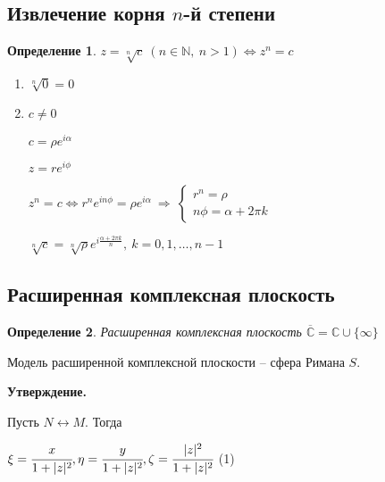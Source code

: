 \documentclass[draft]{article}
\newcommand{\then}{\ \Rightarrow\ }
\renewcommand{\C}{\mathbb{C}}
\newcommand{\N}{\mathbb{N}}
\newcommand{\LRA}{\Leftrightarrow}
\renewcommand{\bar}{\overline}
\newcommand{\opr}[1]{\begin{opred}#1\end{opred}}
\newtheorem*{opred}{Определение}
\theoremstyle{remark}
\begin{document}
\subsection{Извлечение корня $n$-й степени}

\opr{$z=\sqrt[n]{c}\ (n\in\N,\ n>1)\LRA z^n=c$}
\begin{enumerate}
\item$\sqrt[n]{0}=0$
\item$c\neq0$

$c=\rho e^{i\alpha}$

$z=re^{i\phi}$

$z^n=c\LRA r^ne^{in\phi}=\rho e^{i\alpha}\then\left\{\begin{matrix}
r^n=\rho \\
n\phi=\alpha+2\pi k
\end{matrix}\right.$

$\sqrt[n]{c}=\sqrt[n]{\rho}e^{i\frac{\alpha+2\pi k}{n}},\ k=0,1,\ldots,n-1$
\end{enumerate}


\subsection{Расширенная комплексная плоскость}

\begin{opred}
Расширенная комплексная плоскость $\bar{\C}=\C\cup\{\infty\}$
\end{opred}
Модель расширенной комплексной плоскости -- сфера Римана $S$.

{\bfseries Утверждение.}

Пусть $N\leftrightarrow M$. Тогда

$\xi=\cfrac{x}{1+|z|^2}, \eta=\cfrac{y}{1+|z|^2}, \zeta=\cfrac{|z|^2}{1+|z|^2}$ (1)
\end{document}
